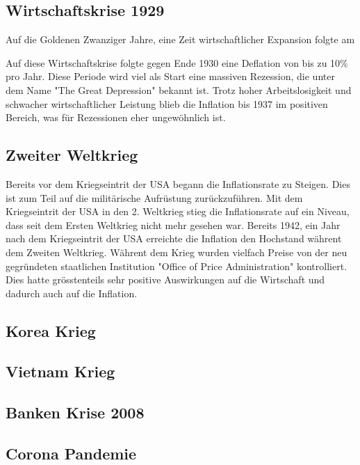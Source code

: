 \subsection{Wirtschaftskrise 1929}
Auf die Goldenen Zwanziger Jahre, eine Zeit wirtschaftlicher Expansion folgte am %

Auf diese Wirtschaftskrise folgte gegen Ende 1930 eine Deflation von bis zu 10\% pro Jahr.
Diese Periode wird viel als Start eine massiven Rezession, die unter dem Name "The Great Depression" bekannt ist.
Trotz hoher Arbeitslosigkeit und schwacher wirtschaftlicher Leistung blieb die Inflation bis 1937 im positiven Bereich, was für Rezessionen eher ungewöhnlich ist. %

\subsection{Zweiter Weltkrieg}
Bereits vor dem Kriegseintrit der USA begann die Inflationsrate zu Steigen.
Dies ist zum Teil auf die militärische Aufrüstung zurückzuführen. %
Mit dem Kriegseintrit der USA in den 2. Weltkrieg stieg die Inflationsrate auf ein Niveau, dass seit dem Ersten Weltkrieg nicht mehr gesehen war.
Bereits 1942, ein Jahr nach dem Kriegseintrit der USA erreichte die Inflation den Hochstand währent dem Zweiten Weltkrieg.
Währent dem Krieg wurden vielfach Preise von der neu gegründeten staatlichen Institution "Office of Price Administration" kontrolliert.
Dies hatte grösstenteils sehr positive Auswirkungen auf die Wirtschaft und dadurch auch auf die Inflation. %

\subsection{Korea Krieg}


\subsection{Vietnam Krieg}

\subsection{Banken Krise 2008}

\subsection{Corona Pandemie}
